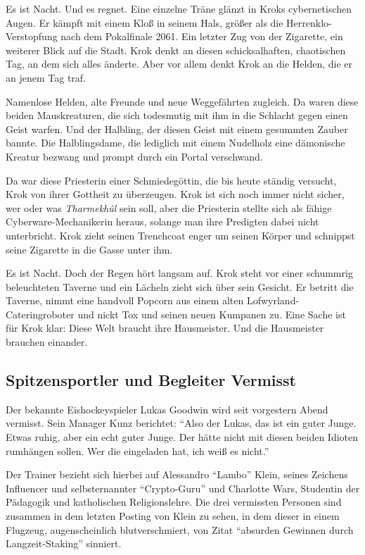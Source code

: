 \documentclass[final]{multiversum}
\begin{document}
Es ist Nacht. Und es regnet. Eine einzelne Träne glänzt in Kroks cybernetischen
Augen. Er kämpft mit einem Kloß in seinem Hals, größer als die
Herrenklo-Verstopfung nach dem Pokalfinale 2061. Ein letzter Zug von der
Zigarette, ein weiterer Blick auf die Stadt. Krok denkt an diesen
schicksalhaften, chaotischen Tag, an dem sich alles änderte. Aber vor allem
denkt Krok an die Helden, die er an jenem Tag traf.

Namenlose Helden, alte Freunde und neue Weggefährten zugleich. Da waren diese
beiden Mauskreaturen, die sich todesmutig mit ihm in die Schlacht gegen einen
Geist warfen. Und der Halbling, der diesen Geist mit einem gesummten Zauber
bannte. Die Halblingsdame, die lediglich mit einem Nudelholz eine
dämonische Kreatur bezwang und prompt durch ein Portal verschwand.

Da war diese Priesterin einer Schmiedegöttin, die bis heute ständig versucht,
Krok von ihrer Gottheit zu überzeugen. Krok ist sich noch immer nicht sicher,
wer oder was \emph{Tharmekhûl} sein soll, aber die Priesterin stellte sich als
fähige Cyberware-Mechanikerin heraus, solange man ihre Predigten dabei nicht
unterbricht. Krok zieht seinen Trenchcoat enger um seinen Körper und schnippst
seine Zigarette in die Gasse unter ihm.

Es ist Nacht. Doch der Regen hört langsam auf. Krok steht vor einer schummrig
beleuchteten Taverne und ein Lächeln zieht sich über sein Gesicht. Er betritt
die Taverne, nimmt eine handvoll Popcorn aus einem alten
Lofwyrland-Cateringroboter und nickt Tox und seinen neuen Kumpanen zu. Eine
Sache ist für Krok klar: Diese Welt braucht ihre Hausmeister. Und die
Hausmeister brauchen einander.  

\subsection{Spitzensportler und Begleiter Vermisst}
Der bekannte Eishockeyspieler Lukas Goodwin wird seit vorgestern Abend vermisst.
Sein Manager Kunz berichtet: \enquote{Also der Lukas, das ist ein guter Junge.
Etwas ruhig, aber ein echt guter Junge. Der hätte nicht mit diesen beiden
Idioten rumhängen sollen. Wer die eingeladen hat, ich weiß es nicht.}

Der Trainer bezieht sich hierbei auf Alessandro \enquote{Lambo} Klein, seines
Zeichens Influencer und selbsternannter \enquote{Crypto-Guru} und Charlotte
Wars, Studentin der Pädagogik und katholischen Religionslehre. Die drei
vermissten Personen sind zusammen in dem letzten Posting von Klein zu sehen, in
dem dieser in einem Flugzeug, augenscheinlich blutverschmiert, von \textendash{}
Zitat \textendash{} \enquote{absurden Gewinnen durch Langzeit-Staking} sinniert.
\end{document}

